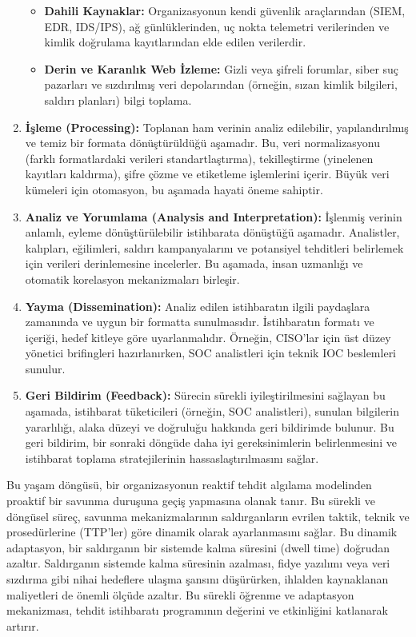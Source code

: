 \begin{enumerate}
\begin{itemize}
        \item \textbf{Dahili Kaynaklar:} Organizasyonun kendi güvenlik araçlarından (SIEM, EDR, IDS/IPS), ağ günlüklerinden, uç nokta telemetri verilerinden ve kimlik doğrulama kayıtlarından elde edilen verilerdir.
        \item \textbf{Derin ve Karanlık Web İzleme:} Gizli veya şifreli forumlar, siber suç pazarları ve sızdırılmış veri depolarından (örneğin, sızan kimlik bilgileri, saldırı planları) bilgi toplama.
    \end{itemize}
    \item \textbf{İşleme (Processing):} Toplanan ham verinin analiz edilebilir, yapılandırılmış ve temiz bir formata dönüştürüldüğü aşamadır. Bu, veri normalizasyonu (farklı formatlardaki verileri standartlaştırma), tekilleştirme (yinelenen kayıtları kaldırma), şifre çözme ve etiketleme işlemlerini içerir. Büyük veri kümeleri için otomasyon, bu aşamada hayati öneme sahiptir.
    \item \textbf{Analiz ve Yorumlama (Analysis and Interpretation):} İşlenmiş verinin anlamlı, eyleme dönüştürülebilir istihbarata dönüştüğü aşamadır. Analistler, kalıpları, eğilimleri, saldırı kampanyalarını ve potansiyel tehditleri belirlemek için verileri derinlemesine incelerler. Bu aşamada, insan uzmanlığı ve otomatik korelasyon mekanizmaları birleşir.
    \item \textbf{Yayma (Dissemination):} Analiz edilen istihbaratın ilgili paydaşlara zamanında ve uygun bir formatta sunulmasıdır. İstihbaratın formatı ve içeriği, hedef kitleye göre uyarlanmalıdır. Örneğin, CISO'lar için üst düzey yönetici brifingleri hazırlanırken, SOC analistleri için teknik IOC beslemleri sunulur.
    \item \textbf{Geri Bildirim (Feedback):} Sürecin sürekli iyileştirilmesini sağlayan bu aşamada, istihbarat tüketicileri (örneğin, SOC analistleri), sunulan bilgilerin yararlılığı, alaka düzeyi ve doğruluğu hakkında geri bildirimde bulunur. Bu geri bildirim, bir sonraki döngüde daha iyi gereksinimlerin belirlenmesini ve istihbarat toplama stratejilerinin hassaslaştırılmasını sağlar.
\end{enumerate}

Bu yaşam döngüsü, bir organizasyonun reaktif tehdit algılama modelinden proaktif bir savunma duruşuna geçiş yapmasına olanak tanır. Bu sürekli ve döngüsel süreç, savunma mekanizmalarının saldırganların evrilen taktik, teknik ve prosedürlerine (TTP'ler) göre dinamik olarak ayarlanmasını sağlar. Bu dinamik adaptasyon, bir saldırganın bir sistemde kalma süresini (dwell time) doğrudan azaltır. Saldırganın sistemde kalma süresinin azalması, fidye yazılımı veya veri sızdırma gibi nihai hedeflere ulaşma şansını düşürürken, ihlalden kaynaklanan maliyetleri de önemli ölçüde azaltır. Bu sürekli öğrenme ve adaptasyon mekanizması, tehdit istihbaratı programının değerini ve etkinliğini katlanarak artırır.

